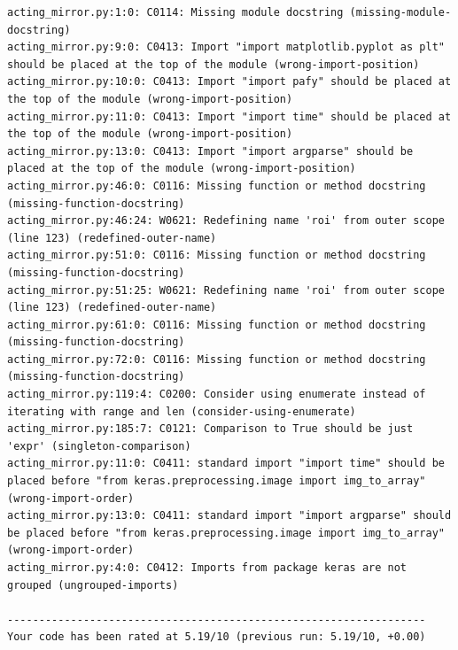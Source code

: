 \documentclass[runningheads,a4paper,11pt]{report}
\begin{document}
\begin{appendices}
\begin{lstlisting}
acting_mirror.py:1:0: C0114: Missing module docstring (missing-module-docstring)
acting_mirror.py:9:0: C0413: Import "import matplotlib.pyplot as plt" should be placed at the top of the module (wrong-import-position)
acting_mirror.py:10:0: C0413: Import "import pafy" should be placed at the top of the module (wrong-import-position)
acting_mirror.py:11:0: C0413: Import "import time" should be placed at the top of the module (wrong-import-position)
acting_mirror.py:13:0: C0413: Import "import argparse" should be placed at the top of the module (wrong-import-position)
acting_mirror.py:46:0: C0116: Missing function or method docstring (missing-function-docstring)
acting_mirror.py:46:24: W0621: Redefining name 'roi' from outer scope (line 123) (redefined-outer-name)
acting_mirror.py:51:0: C0116: Missing function or method docstring (missing-function-docstring)
acting_mirror.py:51:25: W0621: Redefining name 'roi' from outer scope (line 123) (redefined-outer-name)
acting_mirror.py:61:0: C0116: Missing function or method docstring (missing-function-docstring)
acting_mirror.py:72:0: C0116: Missing function or method docstring (missing-function-docstring)
acting_mirror.py:119:4: C0200: Consider using enumerate instead of iterating with range and len (consider-using-enumerate)
acting_mirror.py:185:7: C0121: Comparison to True should be just 'expr' (singleton-comparison)
acting_mirror.py:11:0: C0411: standard import "import time" should be placed before "from keras.preprocessing.image import img_to_array" (wrong-import-order)
acting_mirror.py:13:0: C0411: standard import "import argparse" should be placed before "from keras.preprocessing.image import img_to_array" (wrong-import-order)
acting_mirror.py:4:0: C0412: Imports from package keras are not grouped (ungrouped-imports)

------------------------------------------------------------------
Your code has been rated at 5.19/10 (previous run: 5.19/10, +0.00)
\end{lstlisting}

\end{appendices}
\end{document}
